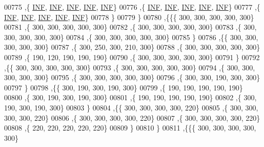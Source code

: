\begin{DoxyCode}
00775    ,\{   \mbox{\hyperlink{1_88_84__epars_8h_a12c2040f25d8e3a7b9e1c2024c618cb6}{INF}},   \mbox{\hyperlink{1_88_84__epars_8h_a12c2040f25d8e3a7b9e1c2024c618cb6}{INF}},   \mbox{\hyperlink{1_88_84__epars_8h_a12c2040f25d8e3a7b9e1c2024c618cb6}{INF}},   \mbox{\hyperlink{1_88_84__epars_8h_a12c2040f25d8e3a7b9e1c2024c618cb6}{INF}},   \mbox{\hyperlink{1_88_84__epars_8h_a12c2040f25d8e3a7b9e1c2024c618cb6}{INF}}\}
00776    ,\{   \mbox{\hyperlink{1_88_84__epars_8h_a12c2040f25d8e3a7b9e1c2024c618cb6}{INF}},   \mbox{\hyperlink{1_88_84__epars_8h_a12c2040f25d8e3a7b9e1c2024c618cb6}{INF}},   \mbox{\hyperlink{1_88_84__epars_8h_a12c2040f25d8e3a7b9e1c2024c618cb6}{INF}},   \mbox{\hyperlink{1_88_84__epars_8h_a12c2040f25d8e3a7b9e1c2024c618cb6}{INF}},   \mbox{\hyperlink{1_88_84__epars_8h_a12c2040f25d8e3a7b9e1c2024c618cb6}{INF}}\}
00777    ,\{   \mbox{\hyperlink{1_88_84__epars_8h_a12c2040f25d8e3a7b9e1c2024c618cb6}{INF}},   \mbox{\hyperlink{1_88_84__epars_8h_a12c2040f25d8e3a7b9e1c2024c618cb6}{INF}},   \mbox{\hyperlink{1_88_84__epars_8h_a12c2040f25d8e3a7b9e1c2024c618cb6}{INF}},   \mbox{\hyperlink{1_88_84__epars_8h_a12c2040f25d8e3a7b9e1c2024c618cb6}{INF}},   \mbox{\hyperlink{1_88_84__epars_8h_a12c2040f25d8e3a7b9e1c2024c618cb6}{INF}}\}
00778    \}
00779   \}
00780  ,\{\{\{   300,   300,   300,   300,   300\}
00781    ,\{   300,   300,   300,   300,   300\}
00782    ,\{   300,   300,   300,   300,   300\}
00783    ,\{   300,   300,   300,   300,   300\}
00784    ,\{   300,   300,   300,   300,   300\}
00785    \}
00786   ,\{\{   300,   300,   300,   300,   300\}
00787    ,\{   300,   250,   300,   210,   300\}
00788    ,\{   300,   300,   300,   300,   300\}
00789    ,\{   190,   120,   190,   190,   190\}
00790    ,\{   300,   300,   300,   300,   300\}
00791    \}
00792   ,\{\{   300,   300,   300,   300,   300\}
00793    ,\{   300,   300,   300,   300,   300\}
00794    ,\{   300,   300,   300,   300,   300\}
00795    ,\{   300,   300,   300,   300,   300\}
00796    ,\{   300,   300,   190,   300,   300\}
00797    \}
00798   ,\{\{   300,   190,   300,   190,   300\}
00799    ,\{   190,   190,   190,   190,   190\}
00800    ,\{   300,   190,   300,   190,   300\}
00801    ,\{   190,   190,   190,   190,   190\}
00802    ,\{   300,   190,   300,   190,   300\}
00803    \}
00804   ,\{\{   300,   300,   300,   300,   220\}
00805    ,\{   300,   300,   300,   300,   220\}
00806    ,\{   300,   300,   300,   300,   220\}
00807    ,\{   300,   300,   300,   300,   220\}
00808    ,\{   220,   220,   220,   220,   220\}
00809    \}
00810   \}
00811  ,\{\{\{   300,   300,   300,   300,   300\}

\end{DoxyCode}

